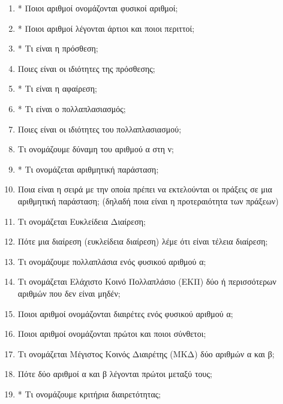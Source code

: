 \documentclass[a4paper,11pt]{report}
\begin{document}



\begin{enumerate}
\item * Ποιοι αριθμοί ονομάζονται φυσικοί αριθμοί;
\item * Ποιοι αριθμοί λέγονται άρτιοι και ποιοι περιττοί;
\item * Τι είναι η πρόσθεση;
\item Ποιες είναι οι ιδιότητες της πρόσθεσης;
\item * Τι είναι η αφαίρεση;
\item * Τι είναι ο πολλαπλασιασμός; 
\item Ποιες είναι οι ιδιότητες του πολλαπλασιασμού;
\item Τι ονομάζουμε δύναμη του αριθμού α στη ν;
\item * Τι ονομάζεται αριθμητική παράσταση;
\item Ποια είναι η σειρά με την οποία πρέπει να εκτελούνται οι πράξεις σε μια αριθμητική παράσταση; 
(δηλαδή ποια είναι η προτεραιότητα των πράξεων)
\item Τι ονομάζεται Ευκλείδεια Διαίρεση;
\item Πότε μια διαίρεση (ευκλείδεια διαίρεση) λέμε ότι είναι τέλεια διαίρεση;
\item Τι ονομάζουμε πολλαπλάσια ενός φυσικού αριθμού α;
\item Τι ονομάζεται Ελάχιστο Κοινό Πολλαπλάσιο (ΕΚΠ) δύο ή περισσότερων αριθμών που δεν είναι μηδέν;
\item Ποιοι αριθμοί ονομάζονται διαιρέτες ενός φυσικού αριθμού α;
\item Ποιοι αριθμοί ονομάζονται πρώτοι και ποιοι σύνθετοι; 
\item Τι ονομάζεται Μέγιστος Κοινός Διαιρέτης (ΜΚΔ) δύο αριθμών α και β;
\item Πότε δύο αριθμοί α και β λέγονται πρώτοι μεταξύ τους;
\item * Τι ονομάζουμε κριτήρια διαιρετότητας;

\end{enumerate}
\end{document}
